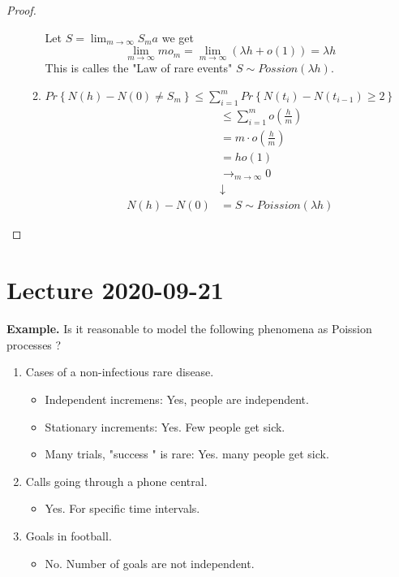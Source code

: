 \documentclass{article}
\theoremstyle{remark}
\newcommand{\newpara}
  {
  \vskip 0.4cm
  }
\begin{document}
\begin{proof}
\begin{itemize}
\begin{enumerate}[label=(\roman*)]
  \newpara
  Let $S = \lim_{m\to  \infty}  S_{m}a $ we get \[
  \lim_{m\to \infty}  mo_{m} = \lim_{m\to \infty}  \left( \lambda h + o \left( 1 \right)  \right) = \lambda h
  \] 
  This is calles the "Law of rare events" $S \sim Possion\left( \lambda h \right)$. 
\item $ \displaystyle Pr \left \{  N\left( h \right)- N\left( 0 \right)\neq S_{m} \right \}  \le \sum_{i=1}^{m} Pr \left \{ N\left( t_{i} \right) - N\left( t_{i-1} \right) \ge 2 \right \} $ \[
    \begin{split}
      & \le \sum_{i=1}^{m}  o\left( \frac{h}{m} \right) \\ 
      &= m\cdot o\left( \frac{h}{m} \right) \\
      &= h o\left( 1 \right) \\
       & \to _{m\to \infty} 0 \\
        & \downarrow \\
        N\left( h \right) - N\left( 0 \right)    &  =S \sim Poission \left( \lambda h \right)
    \end{split} 
\] 

  \end{enumerate}
  \end{itemize}
\end{proof}

\newpage
\section{Lecture 2020-09-21}%
\label{sec:lecture_2020_09_21}

\textbf{Example. } Is it reasonable to model the following phenomena as Poission processes  ?
\begin{enumerate}[label=(\alph*)]
  \item Cases of a non-infectious rare disease. 
    \begin{itemize}
      \item Independent incremens: Yes, people are independent. 
      \item Stationary increments: Yes. Few people get sick.
      \item Many trials, "success " is rare: Yes. many people get sick.
    \end{itemize}
  \item Calls going through a phone central. 
    \begin{itemize}
      \item Yes. For specific time intervals. 
    \end{itemize}
  \item Goals in football.
    \begin{itemize}
      \item No. Number of goals are not independent.
    \end{itemize}
\end{enumerate}
\end{document}
